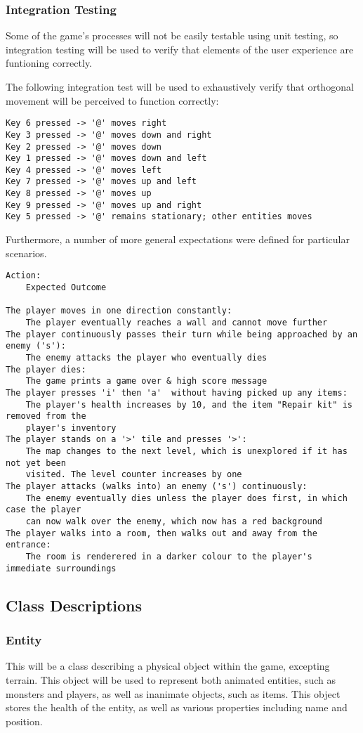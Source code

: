\documentclass{article}
\begin{document}
\subsubsection{Integration Testing}
Some of the game's processes will not be easily testable using unit testing, so integration testing will be used to verify that elements of the user experience are funtioning correctly.

The following integration test will be used to exhaustively verify that orthogonal movement will be perceived to function correctly:
\begin{verbatim}
Key 6 pressed -> '@' moves right
Key 3 pressed -> '@' moves down and right
Key 2 pressed -> '@' moves down
Key 1 pressed -> '@' moves down and left
Key 4 pressed -> '@' moves left
Key 7 pressed -> '@' moves up and left
Key 8 pressed -> '@' moves up
Key 9 pressed -> '@' moves up and right
Key 5 pressed -> '@' remains stationary; other entities moves
\end{verbatim}

Furthermore, a number of more general expectations were defined for particular scenarios.
\begin{verbatim}
Action:
    Expected Outcome

The player moves in one direction constantly:
    The player eventually reaches a wall and cannot move further
The player continuously passes their turn while being approached by an enemy ('s'):
    The enemy attacks the player who eventually dies
The player dies:
    The game prints a game over & high score message
The player presses 'i' then 'a'  without having picked up any items:
    The player's health increases by 10, and the item "Repair kit" is removed from the
    player's inventory
The player stands on a '>' tile and presses '>':
    The map changes to the next level, which is unexplored if it has not yet been
    visited. The level counter increases by one
The player attacks (walks into) an enemy ('s') continuously:
    The enemy eventually dies unless the player does first, in which case the player
    can now walk over the enemy, which now has a red background
The player walks into a room, then walks out and away from the entrance:
    The room is renderered in a darker colour to the player's immediate surroundings
\end{verbatim}
\subsection{Class Descriptions}
\subsubsection{Entity}
This will be a class describing a physical object within the game, excepting terrain. This object will be used to represent both animated entities, such as monsters and players, as well as inanimate objects, such as items. This object stores the health of the entity, as well as various properties including name and position.
\end{document}
